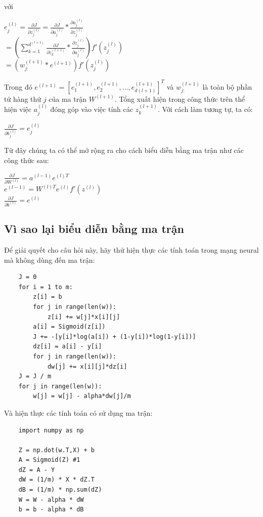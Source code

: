 với
\begin{center}
        $e^{(l)}_{j} = \frac{\partial J}{\partial z_{j}^{(l)}}=\frac{\partial J}{\partial a_{j}^{(l)}}*\frac{\partial a_{j}^{(l)}}{\partial z_{j}^{(l)}}$\\
        $=(\sum_{k=1}^{d^{(l+1)}} \frac{\partial J}{\partial z_{k}^{(l+1)}}*\frac{\partial z_{j}^{(l)}}{\partial a_{j}^{(l)}})f'(z^{(l)}_{j})$\\
        $=(w^{(l+1)}_{j:}*e^{(l+1)})f'(z^{(l)}_{j})$
\end{center}

Trong đó $e^{(l+1)} = [e_{1}^{(l+1)},e_{2}^{(l+1)},...,e_{d(l+1)}^{(l+1)}]^{T}$ và $w_{j:}^{(l+1)}$ là toàn bộ phần tử hàng thứ $j$ của ma trận $W^{(l+1)}$. Tổng xuất hiện trong công thức trên thể hiện việc $a_{j}^{(l)}$ đóng góp vào việc tính các $z_{k}^{(l+1)}$.
Với cách làm tương tự, ta có:
\begin{center}
        $\frac{\partial J}{\partial b^{(l)}_{j}} =e^{(l)}_{j}$\\
\end{center}

Từ đây chúng ta có thể mở rộng ra cho cách biểu diễn bằng ma trận như các công thức sau:
\begin{center}
    $\frac{\partial J}{\partial W^{(l)}} = a^{(l-1)}e^{(l)T}$\\
    $e^{(l-1)} = W^{(l)T}e^{(l)}f'(z^{(l)})$\\
    $\frac{\partial J}{\partial b^{(l)}} = e^{(l)}$
\end{center}

\subsection{Vì sao lại biểu diễn bằng ma trận}
Để giải quyết cho câu hỏi này, hãy thử hiện thực các tính toán trong mạng neural mà không dùng đến ma trận:
\begin{lstlisting}
    J = 0
    for i = 1 to m:
        z[i] = b
        for j in range(len(w)):
            z[i] += w[j]*x[i][j] 
        a[i] = Sigmoid(z[i])
        J += -[y[i]*log(a[i]) + (1-y[i])*log(1-y[i])]
        dz[i] = a[i] - y[i]
        for j in range(len(w)):
            dw[j] += x[i][j]*dz[i]
    J = J / m
    for j in range(len(w)):
        w[j] = w[j] - alpha*dw[j]/m
\end{lstlisting}

Và hiện thực các tính toán có sử dụng ma trận:
\begin{lstlisting}
    import numpy as np 
    
    Z = np.dot(w.T,X) + b
    A = Sigmoid(Z) #1
    dZ = A - Y
    dW = (1/m) * X * dZ.T
    dB = (1/m) * np.sum(dZ)
    W = W - alpha * dW
    b = b - alpha * dB
\end{lstlisting}

